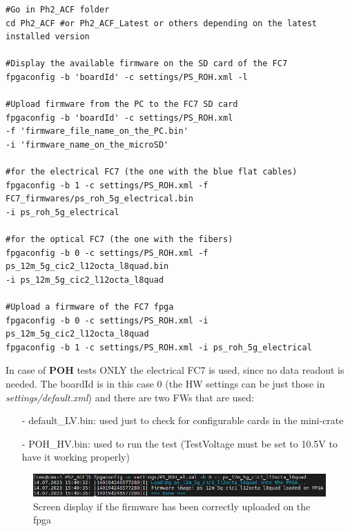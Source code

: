 \documentclass[10pt,a4paper]{article}
\begin{document}
\begin{framed}
\begin{verbatim}
#Go in Ph2_ACF folder
cd Ph2_ACF #or Ph2_ACF_Latest or others depending on the latest installed version

#Display the available firmware on the SD card of the FC7
fpgaconfig -b 'boardId' -c settings/PS_ROH.xml -l

#Upload firmware from the PC to the FC7 SD card
fpgaconfig -b 'boardId' -c settings/PS_ROH.xml 
-f 'firmware_file_name_on_the_PC.bin' 
-i 'firmware_name_on_the_microSD'

#for the electrical FC7 (the one with the blue flat cables)
fpgaconfig -b 1 -c settings/PS_ROH.xml -f FC7_firmwares/ps_roh_5g_electrical.bin 
-i ps_roh_5g_electrical

#for the optical FC7 (the one with the fibers)
fpgaconfig -b 0 -c settings/PS_ROH.xml -f ps_12m_5g_cic2_l12octa_l8quad.bin 
-i ps_12m_5g_cic2_l12octa_l8quad

#Upload a firmware of the FC7 fpga
fpgaconfig -b 0 -c settings/PS_ROH.xml -i  ps_12m_5g_cic2_l12octa_l8quad
fpgaconfig -b 1 -c settings/PS_ROH.xml -i ps_roh_5g_electrical
\end{verbatim}
\end{framed}

In case of {\bf POH} tests ONLY the electrical FC7 is used, since no data readout is needed. The boardId is in this case 0 (the HW settings can be just those in {\it settings/default.xml}) and there are two FWs that are used:
\begin{itemize}
\item[-] default\_LV.bin: used just to check for configurable cards in the mini-crate
\item[-] POH\_HV.bin: used to run the test (TestVoltage must be set to 10.5V to have it working properly)
\end{itemize}
 

\begin{figure}[h!]
\centering
 \includegraphics[width=\linewidth]{firmware-writing.png} 
  \caption{Screen display if the firmware has been correctly uploaded on the fpga}
\end{figure}
\end{document}
